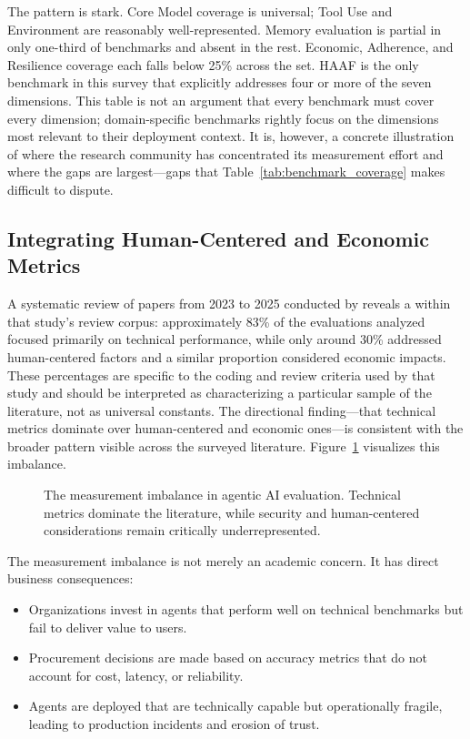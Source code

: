 The pattern is stark. Core Model coverage is universal; Tool Use and Environment are reasonably well-represented. Memory evaluation is partial in only one-third of benchmarks and absent in the rest. Economic, Adherence, and Resilience coverage each falls below 25\% across the set. HAAF is the only benchmark in this survey that explicitly addresses four or more of the seven dimensions. This table is not an argument that every benchmark must cover every dimension; domain-specific benchmarks rightly focus on the dimensions most relevant to their deployment context. It is, however, a concrete illustration of where the research community has concentrated its measurement effort and where the gaps are largest---gaps that Table~\ref{tab:benchmark_coverage} makes difficult to dispute.

\subsection{Integrating Human-Centered and Economic Metrics}

A systematic review of papers from 2023 to 2025 conducted by \citet{measurement_imbalance} reveals a  within that study's review corpus: approximately 83\% of the evaluations analyzed focused primarily on technical performance, while only around 30\% addressed human-centered factors and a similar proportion considered economic impacts. These percentages are specific to the coding and review criteria used by that study and should be interpreted as characterizing a particular sample of the literature, not as universal constants. The directional finding---that technical metrics dominate over human-centered and economic ones---is consistent with the broader pattern visible across the surveyed literature. Figure~\ref{fig:measurement_imbalance} visualizes this imbalance.

\begin{figure}[htbp]
\centering

\vspace{-0.2em}
\fontsize{6}{6.8}\selectfont
\caption{The measurement imbalance in agentic AI evaluation. Technical metrics dominate the literature, while security and human-centered considerations remain critically underrepresented.}
\label{fig:measurement_imbalance}
\end{figure}

The measurement imbalance is not merely an academic concern. It has direct business consequences:

\begin{itemize}
    \item Organizations invest in agents that perform well on technical benchmarks but fail to deliver value to users.
    \item Procurement decisions are made based on accuracy metrics that do not account for cost, latency, or reliability.
    \item Agents are deployed that are technically capable but operationally fragile, leading to production incidents and erosion of trust.
\end{itemize}

